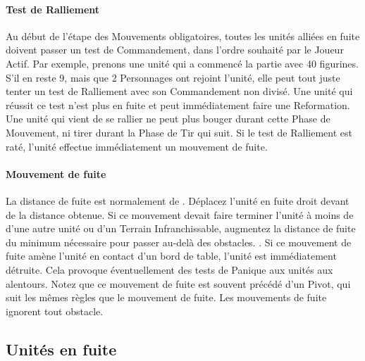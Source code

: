 \hypertarget{rallytest}{\paragraph{Test de Ralliement}}

Au début de l'étape des Mouvements obligatoires, toutes les unités alliées en fuite doivent passer un test de Commandement, dans l'ordre souhaité par le Joueur Actif.  Par exemple, prenons une unité qui a commencé la partie avec 40 figurines. S'il en reste 9, mais que 2 Personnages ont rejoint l'unité, elle peut tout juste tenter un test de Ralliement avec son Commandement non divisé. Une unité qui réussit ce test n'est plus en fuite et peut immédiatement faire une Reformation. Une unité qui vient de se rallier ne peut plus bouger durant cette Phase de Mouvement, ni tirer durant la Phase de Tir qui suit. Si le test de Ralliement est raté, l'unité effectue immédiatement un mouvement de fuite.

\hypertarget{fleemove}{\paragraph{Mouvement de fuite}}

La distance de fuite est normalement de . Déplacez l'unité en fuite droit devant de la distance obtenue. Si ce mouvement devait faire terminer l'unité à moins de  d'une autre unité ou d'un Terrain Infranchissable, augmentez la distance de fuite du minimum nécessaire pour passer au-delà des obstacles. . Si ce mouvement de fuite amène l'unité en contact d'un bord de table, l'unité est immédiatement détruite. Cela provoque éventuellement des tests de Panique aux unités aux alentours. Notez que ce mouvement de fuite est souvent précédé d'un Pivot, qui suit les mêmes règles que le mouvement de fuite. Les mouvements de fuite ignorent tout obstacle.

\subsection{Unités en fuite}

